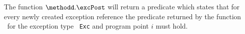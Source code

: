  




The function $\methodd.\excPost$ will return a predicate which states that for every newly created exception reference  
the predicate returned by the function \getExcPost \ for the exception type \mbox{ \rm \texttt{Exc}}   and program point $i$ must hold.


 
